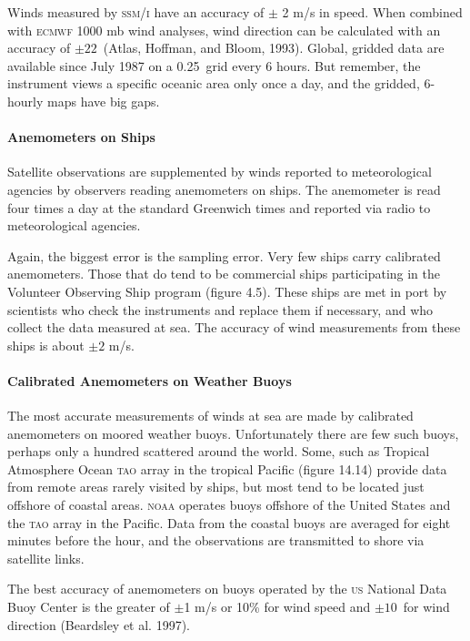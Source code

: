 Winds measured by \textsc{ssm/i} have an
accuracy of $\pm$ 2 m/s in speed. When
combined with \textsc{ecmwf} 1000 mb wind analyses, wind direction can
be calculated with an accuracy of $\pm 22$\degrees\ (Atlas, Hoffman,
and Bloom, 1993). Global, gridded data are available since July 1987
on a 0.25\degrees\ grid every 6 hours. But remember, the instrument
views a specific oceanic area only once a day, and the gridded,
6-hourly maps have big gaps.

\paragraph{Anemometers on Ships}
Satellite observations are supplemented by winds reported to
meteorological agencies by observers reading ane\-mom\-eters on
ships. The anemometer is read four times a day at the standard
Greenwich times and reported via radio to meteorological agencies.

Again, the biggest error is the sampling error. Very few ships carry calibrated anemometers. Those that do
tend to be commercial ships participating in the Volunteer Observing
Ship program (figure 4.5). These ships are met in port by scientists
who check the instruments and replace them if necessary, and who
collect the data measured at sea.  The
accuracy of wind measurements from these
ships is about $\pm 2$ m/s.

\paragraph{Calibrated Anemometers on Weather Buoys}
The most accurate measurements of winds at sea are made by calibrated
anemometers on moored weather buoys. Unfortunately there are few such
buoys, perhaps only a hundred scattered around the world. Some, such
as Tropical Atmosphere Ocean \textsc{tao} array in the tropical
Pacific (figure 14.14) provide data from remote areas rarely visited
by ships, but most tend to be located just offshore of coastal areas.
\textsc{noaa} operates buoys offshore of the United States and the
\textsc{tao} array in the Pacific. Data from the coastal buoys are
averaged for eight minutes before the hour, and the observations are
transmitted to shore via satellite links.

The best accuracy of anemometers on buoys operated by the \textsc{us}
National Data Buoy Center is the greater of \(\pm\)1 m/s or 10\% for
wind speed and $\pm 10$\degrees\ for wind direction (Beardsley et
al. 1997).

